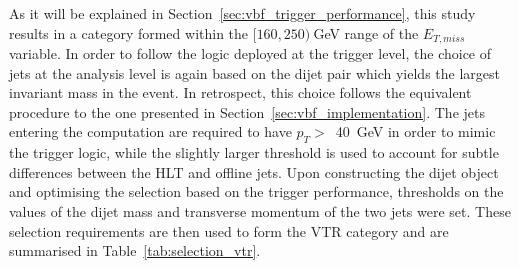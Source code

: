 \hspace{10pt} As it will be explained in Section~\ref{sec:vbf_trigger_performance}, this study results in a category formed within the $[160,250)~$GeV range of the $E_{T, miss}$ variable. In order to follow the logic deployed at the trigger level, the choice of jets at the analysis level is again based on the dijet pair which yields the largest invariant mass in the event. In retrospect, this choice follows the equivalent procedure to the one presented in Section~\ref{sec:vbf_implementation}. The jets entering the computation are required to have $p_T>$~40~GeV in order to mimic the trigger logic, while the slightly larger threshold is used to account for subtle differences between the HLT and offline jets. Upon constructing the dijet object and optimising the selection based on the trigger performance, thresholds on the values of the dijet mass and transverse momentum of the two jets were set. These selection requirements are then used to form the VTR category and are summarised in Table~\ref{tab:selection_vtr}.


